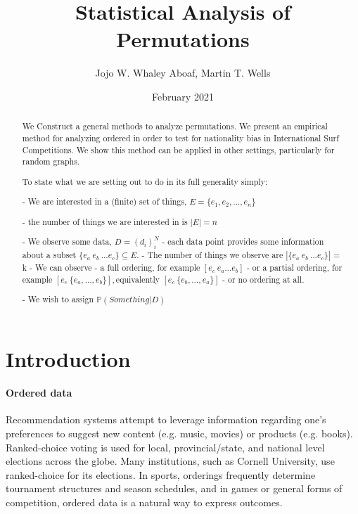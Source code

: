 \documentclass{article}
\title{Statistical Analysis of Permutations}
\author{Jojo W. Whaley Aboaf, Martin T. Wells}
\date{February 2021}
\theoremstyle{definition}
\begin{document}
\maketitle
\tableofcontents

\begin{abstract}
We Construct a general methods to analyze permutations.
We present an empirical method for analyzing ordered in order to test for nationality bias in International Surf Competitions.
We show this method can be applied in other settings, particularly for random graphs.

To state what we are setting out to do in its full generality simply:

- We are interested in a (finite) set of things, $E = \{e_1, e_2, \dots, e_n \} $
	
		- the number of things we are interested in is $|E| = n$

- We observe some data, $D = (d_i)_i^N$
		- each data point provides some information about a subset $ \{ e_a \: e_b \: \dots e_c \} \subseteq E$.
		- The number of things we observe are $|\{ e_a \: e_b \: \dots e_c \} |$ = k
        - We can observe
        	- a full ordering, for example $ [e_c \:  e_a \dots e_b] $
			- or a partial ordering, for example $ [e_c \: \{e_a, \dots, e_b\}], $equivalently $  [e_c \: \{e_b, \dots, e_a\}] $
            - or no ordering at all.
            
- We wish to assign $\mathbb{P}( Something |D)$

\end{abstract}

\section{Introduction}

\paragraph{Ordered data} Recommendation systems attempt to leverage information regarding one’s preferences to suggest new content (e.g. music, movies) or products (e.g. books). Ranked-choice voting is used for local, provincial/state, and national level elections across the globe. Many institutions, such as Cornell University, use ranked-choice for its elections. In sports, orderings frequently determine tournament structures and season schedules, and in games or general forms of competition, ordered data is a natural way to express outcomes.
\end{document}
